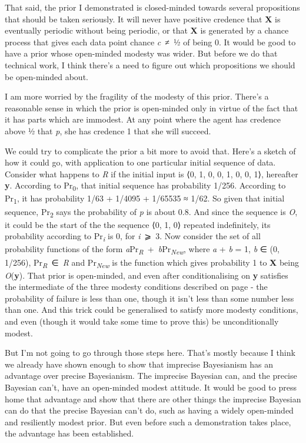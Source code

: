 \documentclass[
  10pt,
  letterpaper,
  DIV=11,
  numbers=noendperiod,
  twoside]{scrartcl}
\begin{document}
That said, the prior I demonstrated is closed-minded towards several
propositions that should be taken seriously. It will never have positive
credence that \textbf{X} is eventually periodic without being periodic,
or that \textbf{X} is generated by a chance process that gives each data
point chance \emph{c}~≠~½ of being 0. It would be good to have a prior
whose open-minded modesty was wider. But before we do that technical
work, I think there's a need to figure out which propositions we should
be open-minded about.

I am more worried by the fragility of the modesty of this prior. There's
a reasonable sense in which the prior is open-minded only in virtue of
the fact that it has parts which are immodest. At any point where the
agent has credence above ½ that \emph{p}, she has credence 1 that she
will succeed.

We could try to complicate the prior a bit more to avoid that. Here's a
sketch of how it could go, with application to one particular initial
sequence of data. Consider what happens to \emph{R} if the initial input
is ⟨0, 1, 0, 0, 1, 0, 0, 1⟩, hereafter \textbf{y}. According to
Pr\textsubscript{0}, that initial sequence has probability 1/256.
According to Pr\textsubscript{1}, it has probability 1/63 + 1/4095 +
1/65535 ≈ 1/62. So given that initial sequence, Pr\textsubscript{2} says
the probability of \emph{p} is about 0.8. And since the sequence is
\emph{O}, it could be the start of the the sequence ⟨0, 1, 0⟩ repeated
indefinitely, its probability according to Pr\textsubscript{\emph{i}} is
0, for \emph{i}~⩾~3. Now consider the set of all probability functions
of the form
\emph{a}Pr\textsubscript{\emph{R}}~+~\emph{b}Pr\textsubscript{\emph{New}},
where \emph{a} + \emph{b} = 1, \emph{b} ∈ (0, 1/256),
Pr\textsubscript{\emph{R}}~∈~\emph{R} and Pr\textsubscript{\emph{New}}
is the function which gives probability 1 to \textbf{X} being
\emph{O}(\textbf{y}). That prior is open-minded, and even after
conditionalising on \textbf{y} satisfies the intermediate of the three
modesty conditions described on page - the probability of failure is
less than one, though it isn't less than some number less than one. And
this trick could be generalised to satisfy more modesty conditions, and
even (though it would take some time to prove this) be unconditionally
modest.

But I'm not going to go through those steps here. That's mostly because
I think we already have shown enough to show that imprecise Bayesianism
has an advantage over precise Bayesianism. The imprecise Bayesian can,
and the precise Bayesian can't, have an open-minded modest attitude. It
would be good to press home that advantage and show that there are other
things the imprecise Bayesian can do that the precise Bayesian can't do,
such as having a widely open-minded and resiliently modest prior. But
even before such a demonstration takes place, the advantage has been
established.
\end{document}
